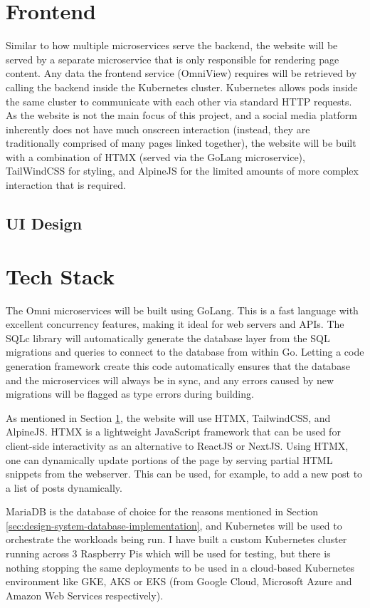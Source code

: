 \section{Frontend}
\label{sec:design-system-frontend}
Similar to how multiple microservices serve the backend, the website will be served by a separate microservice that is only responsible for rendering page content.
Any data the frontend service (OmniView) requires will be retrieved by calling the backend inside the Kubernetes cluster. Kubernetes allows pods inside the same cluster to communicate with each other via standard HTTP requests.
As the website is not the main focus of this project, and a social media platform inherently does not have much onscreen interaction (instead, they are traditionally comprised of many pages linked together), the website will be built with a combination of HTMX (served via the GoLang microservice), TailWindCSS for styling, and AlpineJS for the limited amounts of more complex interaction that is required.


\subsection{UI Design}
\label{sec:design-ui}

\section{Tech Stack}
\label{sec:design-review}
The Omni microservices will be built using GoLang. This is a fast language with excellent concurrency features, making it ideal for web servers and APIs.
The SQLc library will automatically generate the database layer from the SQL migrations and queries to connect to the database from within Go.
Letting a code generation framework create this code automatically ensures that the database and the microservices will always be in sync, and any errors caused by new migrations will be flagged as type errors during building. 

As mentioned in Section \ref{sec:design-system-frontend}, the website will use HTMX, TailwindCSS, and AlpineJS. HTMX is a lightweight JavaScript framework that can be used for client-side interactivity as an alternative to ReactJS or NextJS.
Using HTMX, one can dynamically update portions of the page by serving partial HTML snippets from the webserver. This can be used, for example, to add a new post to a list of posts dynamically.

MariaDB is the database of choice for the reasons mentioned in Section \ref{sec:design-system-database-implementation}, and Kubernetes will be used to orchestrate the workloads being run. I have built a custom Kubernetes cluster running across 3 Raspberry Pis which will be used for testing, but there is nothing stopping the same deployments to be used in a cloud-based Kubernetes environment like GKE, AKS or EKS (from Google Cloud, Microsoft Azure and Amazon Web Services respectively).
